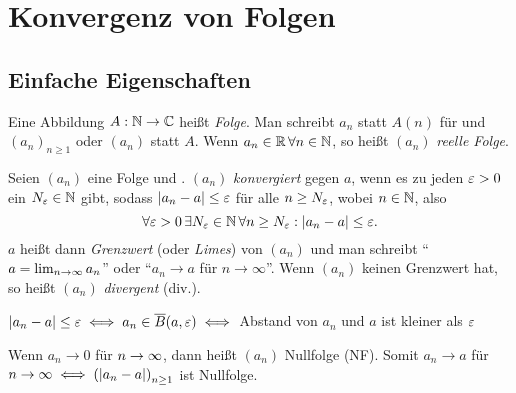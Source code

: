 \documentclass[12pt]{scrreprt}
\begin{document}
\chapter{Konvergenz von Folgen}
\label{cha:konv}

\section{Einfache Eigenschaften}
\label{sec:konv.eigenschaften}
\begin{dfn}
  \label{dev:konv.folge}
  Eine Abbildung $A: \mathbb{N} \rightarrow \mathbb{C}$ heißt \emph{Folge}. Man
  schreibt $a_n$ statt $A(n)$ für  und $(a_n)_{n\ge1}$ oder
  $(a_n)$ statt $A$. Wenn $a_n\in\mathbb{R}\,\forall n\in\mathbb{N}$, so heißt
  $(a_n)$ \emph{reelle Folge}.
\end{dfn}

\begin{dfn}
  \label{dfn:konv.konv}
  Seien $(a_n)$ eine Folge und . $(a_n)$ \emph{konvergiert}
  gegen $a$, wenn es zu jeden $\varepsilon>0$ ein $N_\varepsilon\in\mathbb{N}$ gibt, sodass
  $\left\lvert a_n-a\right\lvert\le\varepsilon$ für alle $n\ge N_\varepsilon$, wobei $n\in\mathbb{N}$, also
  \[\forall\varepsilon>0\,\exists N_\varepsilon\in\mathbb{N}\,\forall n\ge
  N_\varepsilon:\left\lvert a_n-a\right\lvert\le\varepsilon.\] $a$ heißt dann \emph{Grenzwert} (oder
  \emph{Limes}) von $(a_n)$ und man schreibt "`$a = \lim_{n\rightarrow\infty}a_n$"'
  oder "`$a_n \to a$ für $n \to \infty$"'. Wenn $(a_n)$ keinen
  Grenzwert hat, so heißt $(a_n)$ \emph{divergent} (div.).
\end{dfn}

\begin{bem*}
  $\left\lvert a_n-a\right\lvert\le\varepsilon \iff a_n \in \overline{B}(a,\varepsilon) \iff $ Abstand von
  $a_n$ und $a$ ist kleiner als $\varepsilon$
\end{bem*}

\begin{bem*}
  Wenn $a_n \to 0$ für $n\rightarrow\infty$, dann heißt $(a_n)$ Nullfolge
  (NF). Somit $a_n \to a$ für $n\rightarrow\infty \iff
  \left(\left\lvert a_n-a\right\lvert\right)_{n\ge1}$ ist Nullfolge.
\end{bem*}
\end{document}

